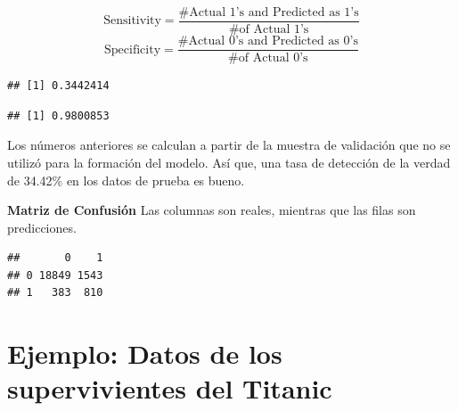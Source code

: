 \documentclass[]{book}
\newenvironment{Shaded}{\begin{snugshade}}{\end{snugshade}}
\newcommand{\KeywordTok}[1]{\textcolor[rgb]{0.13,0.29,0.53}{\textbf{#1}}}
\newcommand{\DataTypeTok}[1]{\textcolor[rgb]{0.13,0.29,0.53}{#1}}
\newcommand{\OperatorTok}[1]{\textcolor[rgb]{0.81,0.36,0.00}{\textbf{#1}}}
\newcommand{\NormalTok}[1]{#1}
\begin{document}
\[
\text{Sensitivity}=\frac{\#\text{Actual 1's and Predicted as 1's}}{\# \text{of Actual 1's}}
\] \[
\text{Specificity}=\frac{\#\text{Actual 0's and Predicted as 0's}}{\# \text{of Actual 0's}}
\]

\begin{Shaded}
\end{Shaded}

\begin{verbatim}
## [1] 0.3442414
\end{verbatim}

\begin{Shaded}
\end{Shaded}

\begin{verbatim}
## [1] 0.9800853
\end{verbatim}

Los números anteriores se calculan a partir de la muestra de validación
que no se utilizó para la formación del modelo. Así que, una tasa de
detección de la verdad de 34.42\% en los datos de prueba es bueno.

\textbf{Matriz de Confusión} Las columnas son reales, mientras que las
filas son predicciones.

\begin{Shaded}
\end{Shaded}

\begin{verbatim}
##       0    1
## 0 18849 1543
## 1   383  810
\end{verbatim}

\section{Ejemplo: Datos de los supervivientes del
Titanic}\label{ejemplo-datos-de-los-supervivientes-del-titanic}
\end{document}

